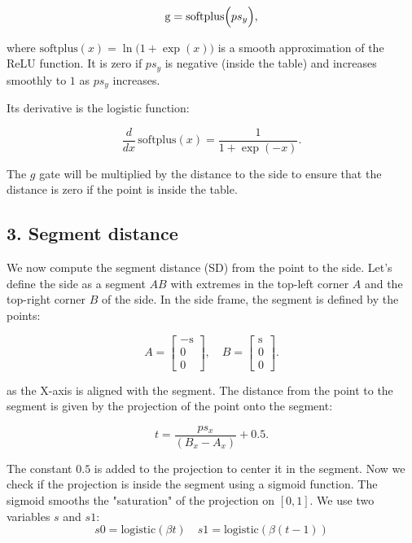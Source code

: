 \documentclass[11pt]{article}
\begin{document}
    \begin{equation}
        \text{g} = \text{softplus}\Bigl(ps_y\Bigr),
    \end{equation}

    where \(\text{softplus}(x)=\ln\bigl(1+\exp(x)\bigr)\) is a smooth approximation of the ReLU function.
    It is zero if $ps_y$ is negative (inside the table) and increases smoothly to $1$ as $ps_y$ increases.

    Its derivative is the logistic function:

    \begin{equation}
        \frac{d}{dx}\,\text{softplus}(x) = \frac{1}{1+\exp(-x)}.
    \end{equation}

    The $g$ gate will be multiplied by the distance to the side to ensure that the distance is zero if the point is inside the table.

    \subsection*{3. Segment distance}
        We now compute the segment distance (SD) from the point to the side.
        Let's define the side as a segment $AB$ with extremes in the top-left corner $A$ and the top-right corner $B$ of the side.
        In the side frame, the segment is defined by the points:

        \begin{equation}
            A = \begin{bmatrix} -\text{s} \\ 0 \\ 0 \end{bmatrix},\quad
            B = \begin{bmatrix} \text{s} \\ 0 \\ 0 \end{bmatrix}.
        \end{equation}

        as the X-axis is aligned with the segment.
        The distance from the point to the segment is given by the projection of the point onto the segment:

        \begin{equation}
            t = \frac{ps_x}{(B_x - A_x)} + 0.5.
        \end{equation}

        The constant \(0.5\) is added to the projection to center it in the segment.
        Now we check if the projection is inside the segment using a sigmoid function.
        The sigmoid smooths the "saturation" of the projection on $[0, 1]$.
        We use two variables $s$ and $s1$:
        \begin{equation}
            s0 = \text{logistic}(\beta t) \quad
            s1 = \text{logistic}(\beta (t-1))
        \end{equation}
\end{document}
